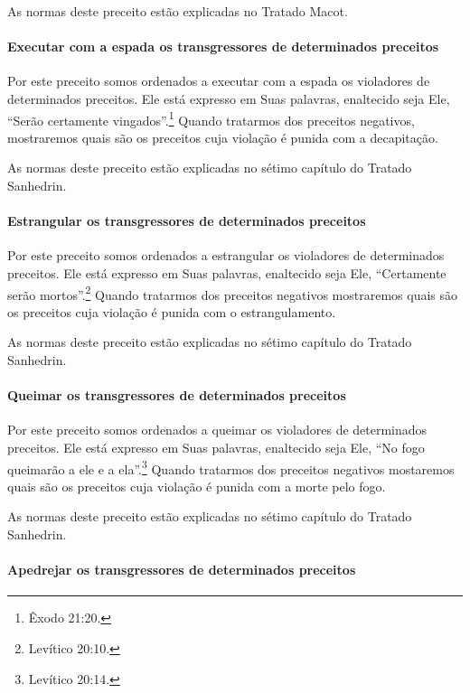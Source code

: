 \begin{multicols}{2}
As normas deste preceito estão explicadas no Tratado Macot\starr.

\paragraph{Executar com a espada os transgressores de determinados preceitos}

Por este preceito somos ordenados a executar com a espada os violadores
de determinados preceitos. Ele está expresso em Suas palavras,
enaltecido seja Ele, ``Serão certamente vingados''.\footnote{Êxodo 21:20.}
Quando tratarmos dos preceitos negativos, mostraremos quais são os
preceitos cuja violação é punida com a decapitação.

As normas deste preceito estão explicadas no sétimo capítulo do Tratado
Sanhedrin\starr.

\paragraph{Estrangular os transgressores de determinados preceitos}

Por este preceito somos ordenados a estrangular os violadores de
determinados preceitos. Ele está expresso em Suas palavras, enaltecido
seja Ele, ``Certamente serão mortos''.\footnote{Levítico 20:10.} Quando tratarmos
dos preceitos negativos mostraremos quais são os preceitos cuja violação
é punida com o estrangulamento.

As normas deste preceito estão explicadas no sétimo capítulo do Tratado
Sanhedrin\starr.

\paragraph{Queimar os transgressores de determinados preceitos}

Por este preceito somos ordenados a queimar os violadores de
determinados preceitos. Ele está expresso em Suas palavras, enaltecido
seja Ele, ``No fogo queimarão a ele e a ela''.\footnote{Levítico 20:14.} Quando
tratarmos dos preceitos negativos mostaremos quais são os preceitos
cuja violação é punida com a morte pelo fogo.

As normas deste preceito estão explicadas no sétimo capítulo do Tratado
Sanhedrin\starr.

\paragraph{Apedrejar os transgressores de determinados preceitos}


\end{multicols}
